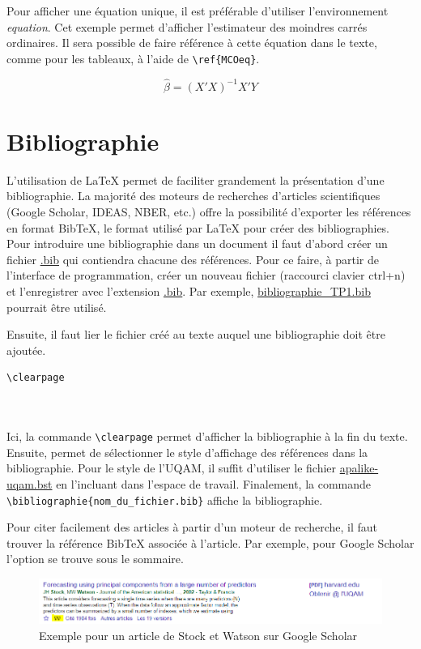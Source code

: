 \documentclass[12pt]{article}
\begin{document}
	Pour afficher une équation unique, il est préférable d'utiliser l'environnement \textit{equation}. Cet exemple permet d'afficher l'estimateur des moindres carrés ordinaires. Il sera possible de faire référence à cette équation dans le texte, comme pour les tableaux, à l'aide de \lstinline|\ref{MCOeq}|.
	
	\begin{equation}
	\hat{\beta} = (X'X)^{-1}X'Y
	\label{MCOeq}
	\end{equation}
	
	\section{Bibliographie}
	
	L'utilisation de LaTeX permet de faciliter grandement la présentation d'une bibliographie. La majorité des moteurs de recherches d'articles scientifiques (Google Scholar, IDEAS, NBER, etc.) offre la possibilité d'exporter les références en format BibTeX, le format utilisé par LaTeX pour créer des bibliographies. Pour introduire une bibliographie dans un document il faut d'abord créer un fichier \url{.bib} qui contiendra chacune des références. Pour ce faire, à partir de l'interface de programmation, créer un nouveau fichier (raccourci clavier ctrl+n) et l'enregistrer avec l'extension \url{.bib}. Par exemple, \url{bibliographie_TP1.bib} pourrait être utilisé.
	
	Ensuite, il faut lier le fichier créé au texte auquel une bibliographie doit être ajoutée. 
	\begin{lstlisting}[frame=single]
	\clearpage
	
	
	\end{lstlisting}
	
	Ici, la commande \lstinline|\clearpage| permet d'afficher la bibliographie à la fin du texte. Ensuite, \lstinline|| permet de sélectionner le style d'affichage des références dans la bibliographie. Pour le style de l'UQAM, il suffit d'utiliser le fichier \url{apalike-uqam.bst} en l'incluant dans l'espace de travail. Finalement, la commande \lstinline|\bibliographie{nom_du_fichier.bib}| affiche la bibliographie.
	
	Pour citer facilement des articles à partir d'un moteur de recherche, il faut trouver la référence BibTeX associée à l'article. Par exemple, pour Google Scholar l'option se trouve sous le sommaire. 
	
	\begin{figure}[H]
		\includegraphics[width=5.5in]{googleScholar.png}
		\caption{Exemple pour un article de Stock et Watson sur Google Scholar}
	\end{figure}
	
\end{document}
